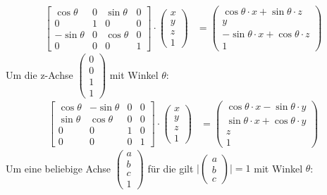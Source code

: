 \documentclass[titlepage, 11pt, a4paper, ngerman]{article}
\begin{document}
\begin{align*}
    \begin{bmatrix} 
    \cos{\theta} & 0 & \sin{\theta} & 0 \\
    0 & 1 & 0 & 0 \\
    - \sin{\theta} & 0 & \cos{\theta} & 0 \\
    0 & 0 & 0 & 1
    \end{bmatrix} \cdot
    \begin{pmatrix}
    x \\ y \\ z \\ 1
    \end{pmatrix} &= 
    \begin{pmatrix}
    \cos{\theta} \cdot x + \sin{\theta} \cdot z \\
    y \\
    - \sin{\theta} \cdot x + \cos{\theta} \cdot z \\
    1
    \end{pmatrix}
\end{align*}
\bigbreak
Um die z-Achse $
\begin{pmatrix}
0 \\
0 \\
1 \\
1
\end{pmatrix}$ mit Winkel $\theta$:
\begin{align*}
    \begin{bmatrix} 
    \cos{\theta} & - \sin{\theta} & 0 & 0 \\
    \sin{\theta} & \cos{\theta} & 0 & 0 \\
    0 & 0 & 1 & 0 \\
    0 & 0 & 0 & 1
    \end{bmatrix} \cdot
    \begin{pmatrix}
    x \\ y \\ z \\ 1
    \end{pmatrix} &= 
    \begin{pmatrix}
    \cos{\theta} \cdot x - \sin{\theta} \cdot y \\
    \sin{\theta} \cdot x + \cos{\theta} \cdot y \\
    z \\
    1
    \end{pmatrix}
\end{align*}
\bigbreak
Um eine beliebige Achse $
\begin{pmatrix}
a \\
b \\
c \\
1
\end{pmatrix} $ für die gilt $ \Biggl|\begin{pmatrix}
a \\
b \\
c
\end{pmatrix}\Biggl| = 1$ mit Winkel $\theta$:
\end{document}

